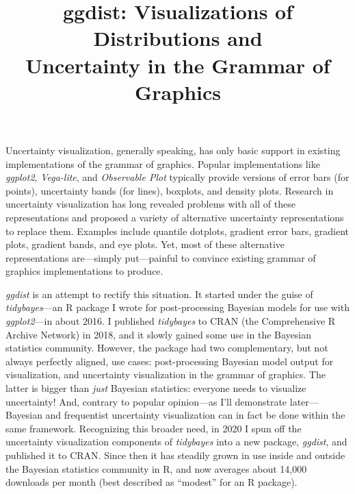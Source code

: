\documentclass[journal]{vgtc}                     %
\title{ggdist: Visualizations of Distributions and\\Uncertainty in the Grammar of Graphics}
\author{%
  \authororcid{Matthew Kay}{0000-0001-9446-0419}
}
\begin{document}


\maketitle



Uncertainty visualization, generally speaking, has only basic support in existing implementations of the grammar of graphics. Popular implementations like \textit{ggplot2}, \textit{Vega-lite}, and \textit{Observable Plot} typically provide versions of error bars (for points), uncertainty bands (for lines), boxplots, and density plots. Research in uncertainty visualization has long revealed problems with all of these representations and proposed a variety of alternative uncertainty representations to replace them. Examples include quantile dotplots, gradient error bars, gradient plots, gradient bands, and eye plots. Yet, most of these alternative representations are---simply put---painful to convince existing grammar of graphics implementations to produce.

\textit{ggdist} is an attempt to rectify this situation. It started under the guise of \textit{tidybayes}---an R package I wrote for post-processing Bayesian models for use with \textit{ggplot2}---in about 2016. I published \textit{tidybayes} to CRAN (the Comprehensive R Archive Network) in 2018, and it slowly gained some use in the Bayesian statistics community. However, the package had two complementary, but not always perfectly aligned, use cases: post-processing Bayesian model output for visualization, and uncertainty visualization in the grammar of graphics. The latter is bigger than \textit{just} Bayesian statistics: everyone needs to visualize uncertainty! And, contrary to popular opinion---as I'll demonstrate later---Bayesian and frequentist uncertainty visualization can in fact be done within the same framework. Recognizing this broader need, in 2020 I spun off the uncertainty visualization components of \textit{tidybayes} into a new package, \textit{ggdist}, and published it to CRAN. Since then it has steadily grown in use inside and outside the Bayesian statistics community in R, and now averages about 14,000 downloads per month (best described as ``modest'' for an R package).
\end{document}
